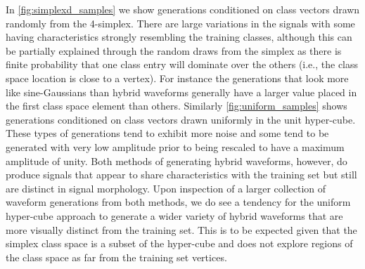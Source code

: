 \documentclass[12pt]{iopart}
\begin{document}
In \cref{fig:simplexd_samples} we show generations conditioned on class vectors drawn randomly from the 4-simplex. There are large variations in the signals with some having characteristics strongly resembling the training classes, although this can be partially explained through the random draws from the simplex as there is finite probability that one class entry will dominate over the others (i.e., the class space location is close to a vertex). For instance the generations that look more like sine-Gaussians than hybrid waveforms generally have a larger value placed in the first class space element than others. Similarly \cref{fig:uniform_samples} shows generations conditioned on class vectors drawn uniformly in the unit hyper-cube. These types of generations tend to exhibit more noise and some tend to be generated with very low amplitude prior to being rescaled to have a maximum amplitude of unity. Both methods of generating hybrid waveforms, however, do produce signals that appear to share characteristics with the training set but still are distinct in signal morphology. Upon inspection of a larger collection of waveform generations from both methods, we do see a tendency for the uniform hyper-cube approach to generate a wider variety of hybrid waveforms that are more visually distinct from the training set. This is to be expected given that the simplex class space is a subset of the hyper-cube and does not explore regions of the class space as far from the training set vertices.
\end{document}
